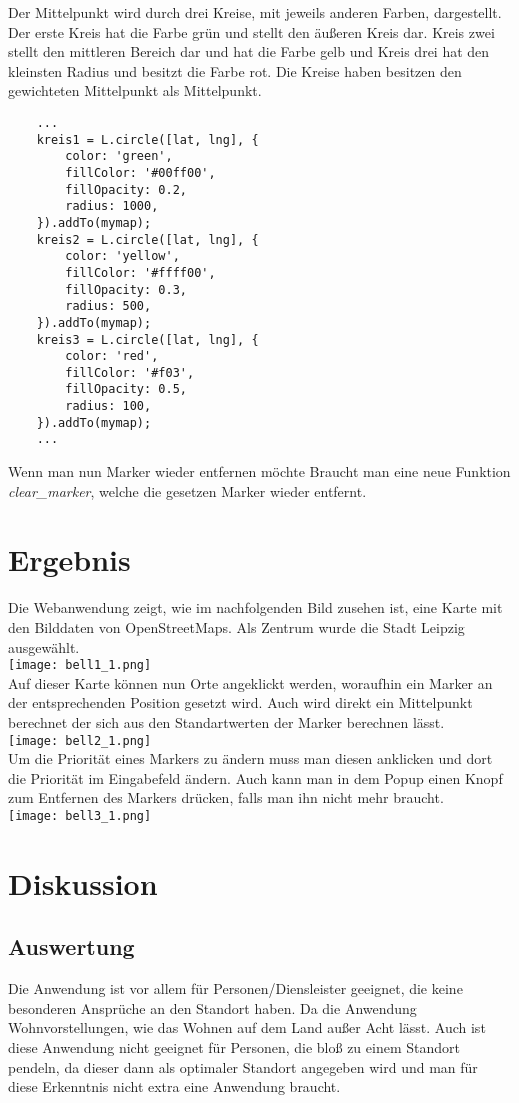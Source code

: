 \documentclass[a4paper, twoside, 12pt]{scrreprt}
\begin{document}
Der Mittelpunkt wird durch drei Kreise, mit jeweils anderen Farben, dargestellt.
Der erste Kreis hat die Farbe grün und stellt den äußeren Kreis dar.
Kreis zwei stellt den mittleren Bereich dar und hat die Farbe gelb und Kreis drei hat den kleinsten Radius und besitzt die Farbe rot.
Die Kreise haben besitzen den gewichteten Mittelpunkt als Mittelpunkt.
\begin{lstlisting}
	...
	kreis1 = L.circle([lat, lng], {
		color: 'green',
		fillColor: '#00ff00',
		fillOpacity: 0.2,
		radius: 1000,
	}).addTo(mymap);
	kreis2 = L.circle([lat, lng], {
		color: 'yellow',
		fillColor: '#ffff00',
		fillOpacity: 0.3,
		radius: 500,
	}).addTo(mymap);
	kreis3 = L.circle([lat, lng], {
		color: 'red',
		fillColor: '#f03',
		fillOpacity: 0.5,
		radius: 100,
	}).addTo(mymap);
	...
\end{lstlisting}
Wenn man nun Marker wieder entfernen möchte Braucht man eine neue Funktion \textit{clear\_marker}, welche die gesetzen Marker wieder entfernt.
\chapter{Ergebnis}
Die Webanwendung zeigt, wie im nachfolgenden Bild zusehen ist, eine Karte mit den Bilddaten von OpenStreetMaps. Als Zentrum wurde die Stadt Leipzig ausgewählt.\\
\texttt{[image: bell1\_1.png]}\\
Auf dieser Karte können nun Orte angeklickt werden, woraufhin ein Marker an der entsprechenden Position gesetzt wird. Auch wird direkt ein Mittelpunkt berechnet der sich aus den Standartwerten der Marker berechnen lässt.\\
\texttt{[image: bell2\_1.png]}\\
Um die Priorität eines Markers zu ändern muss man diesen anklicken und dort die Priorität im Eingabefeld ändern. Auch kann man in dem Popup einen Knopf zum Entfernen des Markers drücken, falls man ihn nicht mehr braucht.\\
\texttt{[image: bell3\_1.png]}\\
\chapter{Diskussion}
\section{Auswertung}
Die Anwendung ist vor allem für Personen/Diensleister geeignet, die keine besonderen Ansprüche an den Standort haben. Da die Anwendung Wohnvorstellungen, wie das Wohnen auf dem Land außer Acht lässt. Auch ist diese Anwendung nicht geeignet für Personen, die bloß zu einem Standort pendeln, da dieser dann als optimaler Standort angegeben wird und man für diese Erkenntnis nicht extra eine Anwendung braucht.
\end{document}
